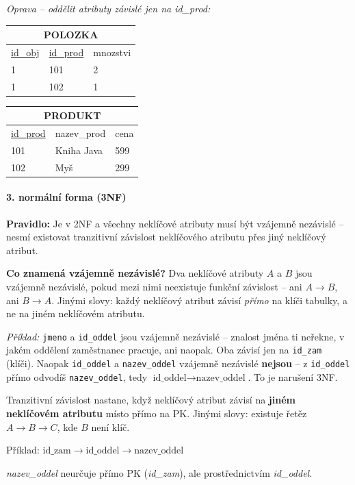 \textit{Oprava -- oddělit atributy závislé jen na id\_prod:}
\begin{center}\footnotesize
\begin{tabular}{lll}
\toprule
\multicolumn{3}{c}{\textbf{POLOZKA}} \\
\midrule
\underline{id\_obj} & \underline{id\_prod} & mnozstvi \\
1 & 101 & 2 \\
1 & 102 & 1 \\
\bottomrule
\end{tabular}
\quad
\begin{tabular}{lll}
\toprule
\multicolumn{3}{c}{\textbf{PRODUKT}} \\
\midrule
\underline{id\_prod} & nazev\_prod & cena \\
101 & Kniha Java & 599 \\
102 & Myš & 299 \\
\bottomrule
\end{tabular}
\end{center}

\paragraph{3. normální forma (3NF)}
\textbf{Pravidlo:} Je v 2NF a všechny neklíčové atributy musí být vzájemně nezávislé -- nesmí existovat tranzitivní závislost neklíčového atributu přes jiný neklíčový atribut.

\textbf{Co znamená vzájemně nezávislé?}
Dva neklíčové atributy $A$ a $B$ jsou vzájemně nezávislé, pokud mezi nimi neexistuje funkční závislost -- ani $A \to B$, ani $B \to A$.
Jinými slovy: každý neklíčový atribut závisí \textit{přímo} na klíči tabulky, a ne na jiném neklíčovém atributu.

\textit{Příklad:} \texttt{jmeno} a \texttt{id\_oddel} jsou vzájemně nezávislé -- znalost jména ti neřekne, v jakém oddělení zaměstnanec pracuje, ani naopak. Oba závisí jen na \texttt{id\_zam} (klíči). Naopak \texttt{id\_oddel} a \texttt{nazev\_oddel} vzájemně nezávislé \textbf{nejsou} -- z \texttt{id\_oddel} přímo odvodíš \texttt{nazev\_oddel}, tedy $\text{id\_oddel} \to \text{nazev\_oddel}$. To je narušení 3NF.

\medskip
\begin{tcolorbox}[colback=yellow!15, colframe=orange!60, title=Co je tranzitivní závislost?]
Tranzitivní závislost nastane, když neklíčový atribut závisí na \textbf{jiném neklíčovém atributu}
místo přímo na PK. Jinými slovy: existuje řetěz $A \to B \to C$, kde $B$ není klíč.

\smallskip
Příklad: $\text{id\_zam} \to \text{id\_oddel} \to \text{nazev\_oddel}$

\textit{nazev\_oddel} neurčuje přímo PK (\textit{id\_zam}), ale prostřednictvím \textit{id\_oddel}.
\end{tcolorbox}

